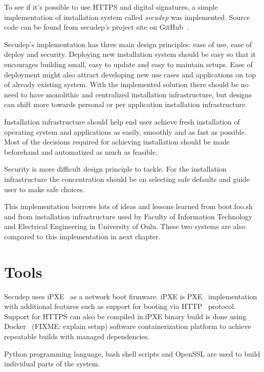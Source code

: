 
To see if it's possible to use HTTPS and digital signatures, a simple
implementation of installation system called \emph{secudep} was
implemented. Source code can be found from secudep's project site on
GitHub~\cite{secudep}.

Secudep's implementation has three main design principles: ease of
use, ease of deploy and security. Deploying new installation system
should be easy so that it encourages building small, easy to update
and easy to maintain setups. Ease of deployment might also attract
developing new use cases and applications on top of already existing
system. With the implemented solution there should be no need to have
monolithic and centralized installation infrastructure, but designs
can shift more towards personal or per application installation
infrastructure.

Installation infrastructure should help end user achieve fresh
installation of operating system and applications as easily, smoothly
and as fast as possible. Most of the decisions required for achieving
installation should be made beforehand and automatized as much as
feasible.

Security is more difficult design principle to tackle. For the
installation infrastructure the concentration should be on selecting
safe defaults and guide user to make safe choices.

This implementation borrows lots of ideas and lessons learned from
boot.foo.sh\cite{boot-foo-sh} and from installation infrastructure
used by Faculty of Information Technology and Electrical Engineering
in University of Oulu. These two systems are also compared to this
implementation in next chapter.

\section{Tools}

Secudep uses iPXE~\cite{iPXE} as a network boot firmware. iPXE is
PXE~\cite{PXEspec} implementation with additional features such as
support for booting via HTTP~\cite{RFC2616} protocol. Support for
HTTPS can also be compiled in.\@ iPXE binary build is done using
Docker~\cite{Docker} (FIXME: explain setup) software containerization
platform to achieve repeatable builds with managed dependencies.

Python programming language, bash shell scripts and OpenSSL are used
to build individual parts of the system.

